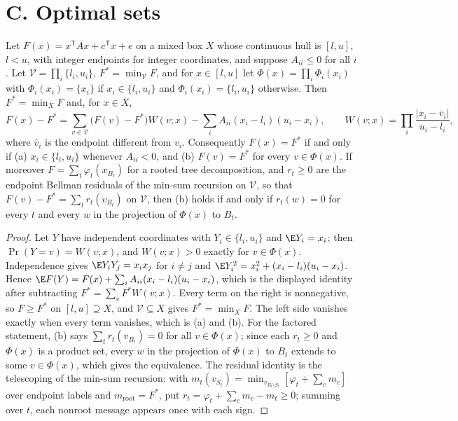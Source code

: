 \section*{C. Optimal sets}

\begin{proposition}\label{lit:prop:faces}
Let $F(x)=x^{\mathsf T}Ax+c^{\mathsf T}x+e$ on a mixed box $X$ whose continuous hull is
$[l,u]$, $l<u$, with integer endpoints for integer coordinates, and suppose $A_{ii}\le0$ for all
$i$. Let $\mathcal V=\prod_i\{l_i,u_i\}$, $F^*=\min_{\mathcal V}F$, and for $x\in[l,u]$ let
$\Phi(x)=\prod_i\Phi_i(x_i)$ with $\Phi_i(x_i)=\{x_i\}$ if $x_i\in\{l_i,u_i\}$ and
$\Phi_i(x_i)=\{l_i,u_i\}$ otherwise. Then $F^*=\min_XF$ and, for $x\in X$,
\[
F(x)-F^*=\sum_{v\in\mathcal V}\bigl(F(v)-F^*\bigr)W(v;x)-\sum_iA_{ii}(x_i-l_i)(u_i-x_i),
\qquad W(v;x)=\prod_i\frac{|x_i-\bar v_i|}{u_i-l_i},
\]
where $\bar v_i$ is the endpoint different from $v_i$. Consequently $F(x)=F^*$ if and only if
(a) $x_i\in\{l_i,u_i\}$ whenever $A_{ii}<0$, and (b) $F(v)=F^*$ for every $v\in\Phi(x)$.
If moreover $F=\sum_t\varphi_t(x_{B_t})$ for a rooted tree decomposition, and
$r_t\ge0$ are the endpoint Bellman residuals of the min-sum recursion on $\mathcal V$, so that
$F(v)-F^*=\sum_tr_t(v_{B_t})$ on $\mathcal V$, then (b) holds if and only if
$r_t(w)=0$ for every $t$ and every $w$ in the projection of $\Phi(x)$ to $B_t$.
\end{proposition}

\begin{proof}
Let $Y$ have independent coordinates with $Y_i\in\{l_i,u_i\}$ and $\E Y_i=x_i$; then
$\Pr(Y=v)=W(v;x)$, and $W(v;x)>0$ exactly for $v\in\Phi(x)$. Independence gives
$\E Y_iY_j=x_ix_j$ for $i\neq j$ and $\E Y_i^2=x_i^2+(x_i-l_i)(u_i-x_i)$. Hence
$\E F(Y)=F(x)+\sum_iA_{ii}(x_i-l_i)(u_i-x_i)$, which is the displayed identity after subtracting
$F^*=\sum_vF^*W(v;x)$. Every term on the right is nonnegative, so $F\ge F^*$ on $[l,u]\supseteq
X$, and $\mathcal V\subseteq X$ gives $F^*=\min_XF$. The left side vanishes exactly when every
term vanishes, which is (a) and (b). For the factored statement, (b) says
$\sum_tr_t(v_{B_t})=0$ for all $v\in\Phi(x)$; since each $r_t\ge0$ and $\Phi(x)$ is a product
set, every $w$ in the projection of $\Phi(x)$ to $B_t$ extends to some $v\in\Phi(x)$, which gives
the equivalence. The residual identity is the telescoping of the min-sum recursion: with
$m_t(v_{S_t})=\min_{v_{B_t\setminus S_t}}[\varphi_t+\sum_{c}m_c]$ over endpoint labels and
$m_{\mathrm{root}}=F^*$, put $r_t=\varphi_t+\sum_cm_c-m_t\ge0$; summing over $t$, each nonroot
message appears once with each sign.
\end{proof}

